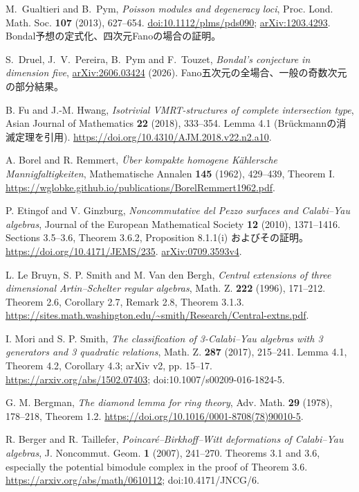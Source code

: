 M.~Gualtieri and B.~Pym,
\emph{Poisson modules and degeneracy loci},
Proc. Lond. Math. Soc. \textbf{107} (2013), 627--654.
\href{https://doi.org/10.1112/plms/pds090}{doi:10.1112/plms/pds090};
\href{https://arxiv.org/abs/1203.4293}{arXiv:1203.4293}.
Bondal予想の定式化、四次元Fanoの場合の証明。

S.~Druel, J.~V.~Pereira, B.~Pym and F.~Touzet,
\emph{Bondal's conjecture in dimension five},
\href{https://arxiv.org/abs/2606.03424}{arXiv:2606.03424} (2026).
Fano五次元の全場合、一般の奇数次元の部分結果。

B. Fu and J.-M. Hwang,
\emph{Isotrivial VMRT-structures of complete intersection type},
Asian Journal of Mathematics \textbf{22} (2018), 333--354.
Lemma 4.1 (Br\"uckmannの消滅定理を引用).
\url{https://doi.org/10.4310/AJM.2018.v22.n2.a10}.

A. Borel and R. Remmert,
\emph{\"Uber kompakte homogene K\"ahlersche Mannigfaltigkeiten},
Mathematische Annalen \textbf{145} (1962), 429--439, Theorem I.
\url{https://wglobke.github.io/publications/BorelRemmert1962.pdf}.

P. Etingof and V. Ginzburg,
\emph{Noncommutative del Pezzo surfaces and Calabi--Yau algebras},
Journal of the European Mathematical Society \textbf{12} (2010), 1371--1416.
Sections 3.5--3.6, Theorem 3.6.2, Proposition 8.1.1(i) およびその証明。
\url{https://doi.org/10.4171/JEMS/235}.
\href{https://arxiv.org/abs/0709.3593v4}{arXiv:0709.3593v4}.

 L. Le Bruyn, S. P. Smith and M. Van den Bergh,
\emph{Central extensions of three dimensional Artin--Schelter regular algebras},
Math. Z. \textbf{222} (1996), 171--212.
Theorem 2.6, Corollary 2.7, Remark 2.8, Theorem 3.1.3.
\url{https://sites.math.washington.edu/~smith/Research/Central-extns.pdf}.

 I. Mori and S. P. Smith,
\emph{The classification of 3-Calabi--Yau algebras with 3 generators and 3 quadratic relations},
Math. Z. \textbf{287} (2017), 215--241.
Lemma 4.1, Theorem 4.2, Corollary 4.3; arXiv v2, pp. 15--17.
\url{https://arxiv.org/abs/1502.07403}; doi:10.1007/s00209-016-1824-5.

 G. M. Bergman,
\emph{The diamond lemma for ring theory}, Adv. Math. \textbf{29} (1978), 178--218, Theorem 1.2.
\url{https://doi.org/10.1016/0001-8708(78)90010-5}.

 R. Berger and R. Taillefer,
\emph{Poincar\'e--Birkhoff--Witt deformations of Calabi--Yau algebras},
J. Noncommut. Geom. \textbf{1} (2007), 241--270.
Theorems 3.1 and 3.6, especially the potential bimodule complex in the proof of Theorem 3.6.
\url{https://arxiv.org/abs/math/0610112}; doi:10.4171/JNCG/6.

